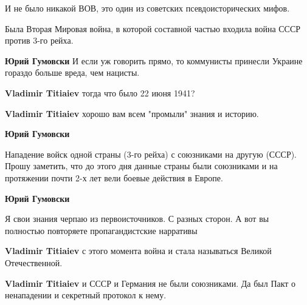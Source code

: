 \begin{itemize}
\begin{itemize}
И не было никакой ВОВ, это один из советских псевдоисторических мифов. 

Была Вторая Мировая война, в которой составной частью входила война СССР против
3-го рейха.


\textbf{Юрий Гумовски} И если уж говорить прямо, то коммунисты принесли Украине гораздо больше вреда, чем нацисты.


\textbf{Vladimir Titiaiev} тогда что было 22 июня 1941?


\textbf{Vladimir Titiaiev} хорошо вам всем "промыли" знания и историю.


\textbf{Юрий Гумовски} 

Нападение войск одной страны (3-го рейха) с союзниками на другую (СССР). Прошу
заметить, что до этого дня данные страны были союзниками и на протяжении почти
2-х лет вели боевые действия в Европе.




\textbf{Юрий Гумовски} 

Я свои знания черпаю из первоисточников. С разных сторон. А вот вы полностью
повторяете пропагандистские нарративы


\textbf{Vladimir Titiaiev} с этого момента война и стала называться Великой Отечественной.


\textbf{Vladimir Titiaiev} и СССР и Германия не были союзниками. Да был Пакт о ненападении и секретный протокол к нему.


\end{itemize}
\end{itemize}
